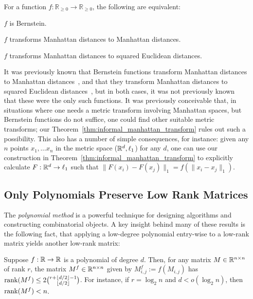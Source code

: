 \begin{theorem} \label{thm:informal_manhattan_transform}

  For a function $f:\mathbb R_{\geq 0}\to\mathbb R_{\geq 0}$, the following are equivalent:

  \begin{tight_enumerate}
    \item $f$ is Bernstein.
    \item $f$ transforms Manhattan distances to
  Manhattan distances.
    \item  $f$ transforms Manhattan distances to squared Euclidean distances.
  \end{tight_enumerate}
\end{theorem}

It was previously known that Bernstein functions transform Manhattan distances to Manhattan distances~\cite{a80}, and that they transform Manhattan distances to squared Euclidean distances~\cite{s38}, but in both cases, it was not previously known that these were the only such functions. It was previously conceivable that, in situations where one needs a metric transform involving Manhattan spaces, but Bernstein functions do not suffice, one could find other suitable metric transforms; our Theorem~\ref{thm:informal_manhattan_transform} rules out such a possibility. This also has a number of simple consequences, for instance: given any $n$ points $x_1, \ldots x_n$ in the metric space (${\mathbb R}^d, \ell_1$) for any $d$, one can use our construction in Theorem~\ref{thm:informal_manhattan_transform} to explicitly calculate $F: {\mathbb R}^d \to \ell_1$ such that $\|F(x_i)-F(x_j)\|_1 = f(\|x_i-x_j\|_1)$. 



\subsection{Only Polynomials Preserve Low Rank Matrices} \label{sec:polymeth}

The \emph{polynomial method} is a powerful technique for designing algorithms and constructing combinatorial objects. A key insight behind many of these results is the following fact, that applying a low-degree polynomial entry-wise to a low-rank matrix yields another low-rank matrix:
\begin{fact} \label{fact:polymethod}
  Suppose $f : {\mathbb R} \to {\mathbb R}$ is a polynomial of degree $d$. Then, for any matrix $M \in {\mathbb R}^{n \times n}$ of rank $r$, the matrix $M^f \in {\mathbb R}^{n \times n}$ given by $M^f_{i,j} := f(M_{i,j})$ has $\operatorname{rank}(M^f) \leq 2\binom{r+\lfloor d/2 \rfloor-1}{\lfloor d/2 \rfloor}$. For instance, if $r = \log_2 n$ and $d < o(\log_2 n)$, then $\operatorname{rank}(M^f) < n$.
\end{fact}


